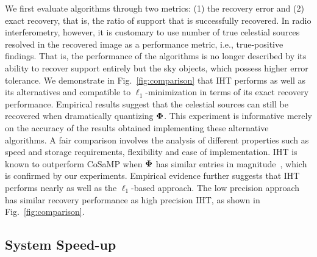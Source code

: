 \documentclass{article}
\begin{document}
We first evaluate algorithms through two metrics: (1) the recovery error and (2) exact recovery, that is, the ratio of support that is successfully recovered. In radio interferometry, however, it is customary to use number of true celestial sources resolved in the recovered image as a performance metric, i.e., true-positive findings. That is, the performance of the algorithms is no longer described by its ability to recover support entirely but the sky objects, which possess higher error tolerance. 
We demonstrate in Fig.~\ref{fig:comparison} that IHT performs as well as its alternatives and compatible to $\ell_1$-minimization in terms of its exact recovery performance. Empirical results suggest that the celestial sources can still be recovered when dramatically quantizing ${\bf \Phi}$.
This experiment is informative merely on the accuracy of the results obtained implementing these alternative algorithms. A fair comparison involves the analysis of different properties such as speed and storage requirements, flexibility and ease of implementation. 
IHT is known to outperform CoSaMP when ${\bf \Phi}$ has similar entries in magnitude~\cite{blumensath2012greedy}, which is confirmed by our experiments. Empirical evidence further suggests that IHT performs nearly as well as the $\ell_1$-based approach. %
The low precision approach has similar recovery performance as high precision IHT, as shown
in Fig.~\ref{fig:comparison}.



\vspace{-0.5em}
\subsection{System Speed-up}
\vspace{-1em}
\end{document}

